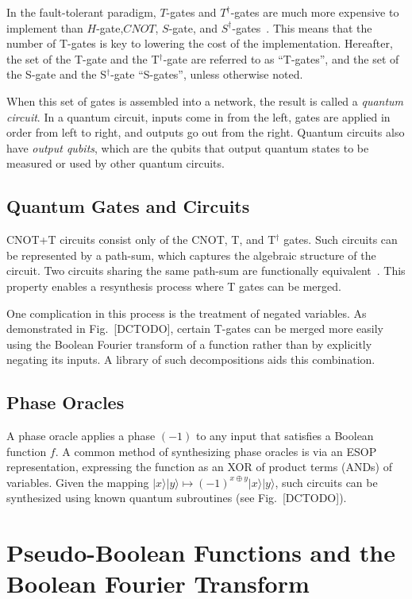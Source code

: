 In the fault-tolerant paradigm, $T$-gates and $T^{\dagger}$-gates are much more expensive to implement than
$H$-gate,$CNOT$, $S$-gate, and $S^{\dagger}$-gates~\cite{bib-bravyi-kitaev-magic-distillation}. This means
that the number of T-gates is key to lowering the cost of the implementation. Hereafter, 
the set of the T-gate and the T$^{\dagger}$-gate are referred to as ``T-gates'', and the set of the S-gate and the
S$^{\dagger}$-gate ``S-gates'', unless otherwise noted.

When this set of gates is assembled into a network, the result is called a \emph{quantum circuit}. In a
quantum circuit, inputs come in from the left, gates are applied in order from left to right, and outputs
go out from the right. Quantum circuits also have \emph{output qubits}, which are the qubits that output
quantum states to be measured or used by other quantum circuits. 


\subsection{Quantum Gates and Circuits}
CNOT+T circuits consist only of the CNOT, T, and T$^\dagger$ gates. Such circuits can be represented by a path-sum, which captures the algebraic structure of the circuit. Two circuits sharing the same path-sum are functionally equivalent~\cite{pathsum2018}. This property enables a resynthesis process where T gates can be merged.

One complication in this process is the treatment of negated variables. As demonstrated in Fig.~[DCTODO], certain T-gates can be merged more easily using the Boolean Fourier transform of a function rather than by explicitly negating its inputs. A library of such decompositions aids this combination.

\subsection{Phase Oracles}
A phase oracle applies a phase $(-1)$ to any input that satisfies a Boolean function $f$. A common method of synthesizing phase oracles is via an ESOP representation, expressing the function as an XOR of product terms (ANDs) of variables. Given the mapping $|x\rangle|y\rangle \mapsto (-1)^{x \oplus y}|x\rangle|y\rangle$, such circuits can be synthesized using known quantum subroutines (see Fig.~[DCTODO]).


\section{Pseudo-Boolean Functions and the Boolean Fourier Transform}


